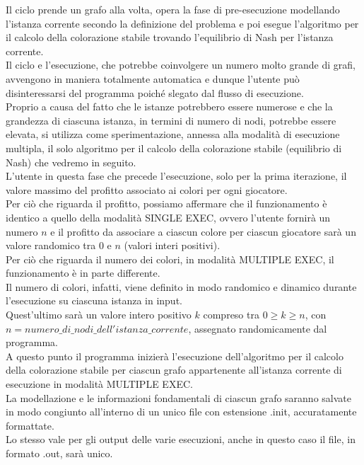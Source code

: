 Il ciclo prende un grafo alla volta, opera la fase di pre-esecuzione modellando l'istanza corrente secondo la definizione del problema e poi esegue l'algoritmo per il calcolo della colorazione stabile trovando l'equilibrio di Nash per l'istanza corrente.\\
Il ciclo e l'esecuzione, che potrebbe coinvolgere un numero molto grande di grafi, avvengono in maniera totalmente automatica e dunque l'utente può disinteressarsi del programma poiché slegato dal flusso di esecuzione.\\

Proprio a causa del fatto che le istanze potrebbero essere numerose e che la grandezza di ciascuna istanza, in termini di numero di nodi, potrebbe essere elevata, si utilizza come sperimentazione, annessa alla modalità di esecuzione multipla, il solo algoritmo per il calcolo della colorazione stabile (equilibrio di Nash) che vedremo in seguito.\\

L'utente in questa fase che precede l'esecuzione, solo per la prima iterazione, il valore massimo del profitto associato ai colori per ogni giocatore.\\

Per ciò che riguarda il profitto, possiamo affermare che il funzionamento è identico a quello della modalità SINGLE EXEC, ovvero l'utente fornirà un numero \(n\) e il profitto da associare a ciascun colore per ciascun giocatore sarà un valore randomico tra 0 e \(n\) (valori interi positivi).\\

Per ciò che riguarda il numero dei colori, in modalità MULTIPLE EXEC, il funzionamento è in parte differente.\\
Il numero di colori, infatti, viene definito in modo randomico e dinamico durante l'esecuzione su ciascuna istanza in input.\\
Quest'ultimo sarà un valore intero positivo \(k\) compreso tra \(0 \geq k \geq n\), con \(n = numero\_di\_nodi\_dell'istanza\_corrente\), assegnato randomicamente dal programma.\\

A questo punto il programma inizierà l'esecuzione dell'algoritmo per il calcolo della colorazione stabile per ciascun grafo appartenente all'istanza corrente di esecuzione in modalità MULTIPLE EXEC.\\
La modellazione e le informazioni fondamentali di ciascun grafo saranno salvate in modo congiunto all'interno di un unico file con estensione .init, accuratamente formattate.\\
Lo stesso vale per gli output delle varie esecuzioni, anche in questo caso il file, in formato .out, sarà unico.\\

